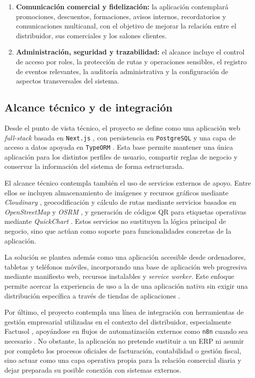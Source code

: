 \begin{enumerate}
    \item \textbf{Comunicación comercial y fidelización:} la aplicación contemplará promociones, descuentos, formaciones, avisos internos, recordatorios y comunicaciones multicanal, con el objetivo de mejorar la relación entre el distribuidor, sus comerciales y los salones clientes.

    \item \textbf{Administración, seguridad y trazabilidad:} el alcance incluye el control de acceso por roles, la protección de rutas y operaciones sensibles, el registro de eventos relevantes, la auditoría administrativa y la configuración de aspectos transversales del sistema.
\end{enumerate}

\subsection{Alcance técnico y de integración}
Desde el punto de vista técnico, el proyecto se define como una aplicación web \textit{full-stack} basada en \texttt{Next.js} \citep{nextjsdocs2026}, con persistencia en \texttt{PostgreSQL} \citep{postgresdocs2026} y una capa de acceso a datos apoyada en \texttt{TypeORM} \citep{typeormentities2026,typeormmigrations2026}. Esta base permite mantener una única aplicación para los distintos perfiles de usuario, compartir reglas de negocio y conservar la información del sistema de forma estructurada.

El alcance técnico contempla también el uso de servicios externos de apoyo. Entre ellos se incluyen almacenamiento de imágenes y recursos gráficos mediante \textit{Cloudinary} \citep{cloudinaryupload2026}, geocodificación y cálculo de rutas mediante servicios basados en \textit{OpenStreetMap} y \textit{OSRM} \citep{nominatimapi2026,osrmdocs2026}, y generación de códigos QR para etiquetas operativas mediante \textit{QuickChart} \citep{quickchartqr2026}. Estos servicios no sustituyen la lógica principal de negocio, sino que actúan como soporte para funcionalidades concretas de la aplicación.

La solución se plantea además como una aplicación accesible desde ordenadores, tabletas y teléfonos móviles, incorporando una base de aplicación web progresiva mediante manifiesto web, recursos instalables y \textit{service worker}. Este enfoque permite acercar la experiencia de uso a la de una aplicación nativa sin exigir una distribución específica a través de tiendas de aplicaciones \citep{webdev-pwa}.

Por último, el proyecto contempla una línea de integración con herramientas de gestión empresarial utilizadas en el contexto del distribuidor, especialmente Factusol \citep{sdelsol-factusol}, apoyándose en flujos de automatización externos como \texttt{n8n} cuando sea necesario \citep{n8n-webhook,n8n-http-request}. No obstante, la aplicación no pretende sustituir a un ERP ni asumir por completo los procesos oficiales de facturación, contabilidad o gestión fiscal, sino actuar como una capa operativa propia para la relación comercial diaria y dejar preparada su posible conexión con sistemas externos.

